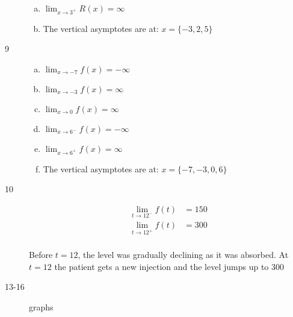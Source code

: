 \documentclass[letterpaper, landscape]{exam}
\begin{document}
\begin{description}
\begin{enumerate}[(a)]
          \item $\lim_{x \to 3^+} R(x) = \boxed{ \infty }$

          \item The vertical asymptotes are at: $x = \{ -3, 2, 5 \}$

        \end{enumerate}

      \item[9]
        \begin{enumerate}[(a)]
          \item $\lim_{x \to -7} f(x) = \boxed{ -\infty }$

          \item $\lim_{x \to -3} f(x) = \boxed{ \infty }$

          \item $\lim_{x \to 0} f(x) = \boxed{ \infty }$

          \item $\lim_{x \to 6^-} f(x) = \boxed{ -\infty }$

          \item $\lim_{x \to 6^+} f(x) = \boxed{ \infty }$

          \item The vertical asymptotes are at: $x = \{ -7, -3, 0, 6 \}$

        \end{enumerate}

      \item[10]
        \begin{align*}
          \lim_{t \to 12^-} f(t) &= \boxed{ 150 } \\
          \lim_{t \to 12^+} f(t) &= \boxed{ 300 } \\
        \end{align*}

        Before $t = 12$, the level was gradually declining as it was absorbed.
        At $t = 12$ the patient gets a new injection and the level jumps up to 300

      \item[13-16] graphs




\end{description}
\end{document}
